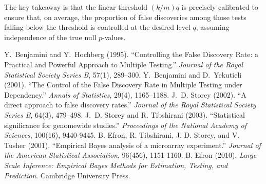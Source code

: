 \documentclass[12pt]{book}
\newcommand{\pvalue}{$p$-value}          %
\begin{document}
The key takeaway is that the linear threshold $(k/m)q$ is precisely calibrated to ensure that, on average, the proportion of false discoveries among those tests falling below the threshold is controlled at the desired level $q$, assuming independence of the true null \pvalue s.

\backmatter
\begin{thebibliography}{9}
 Y.~Benjamini and Y.~Hochberg (1995). ``Controlling the False Discovery Rate: a Practical and Powerful Approach to Multiple Testing.'' \emph{Journal of the Royal Statistical Society Series B}, 57(1), 289–300. 
 Y.~Benjamini and D.~Yekutieli (2001). ``The Control of the False Discovery Rate in Multiple Testing under Dependency.'' \emph{Annals of Statistics}, 29(4), 1165–1188.
 J.~D. Storey (2002). ``A direct approach to false discovery rates.'' \emph{Journal of the Royal Statistical Society Series B}, 64(3), 479–498.
 J.~D. Storey and R. Tibshirani (2003). ``Statistical significance for genomewide studies.'' \emph{Proceedings of the National Academy of Sciences}, 100(16), 9440-9445.
 B. Efron, R. Tibshirani, J. D. Storey, and V. Tusher (2001). ``Empirical Bayes analysis of a microarray experiment.'' \emph{Journal of the American Statistical Association}, 96(456), 1151-1160.
 B. Efron (2010). \emph{Large-Scale Inference: Empirical Bayes Methods for Estimation, Testing, and Prediction}. Cambridge University Press.
\end{thebibliography}
\end{document}

